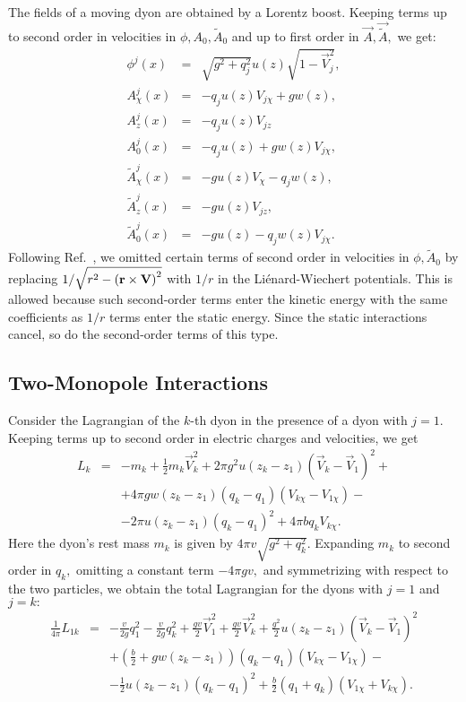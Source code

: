 \documentclass[a4paper,12pt, amsfonts, amssymb]{article}
\newcommand{\tA}{{\tilde{A}}}
\newcommand{\V}{{\vec{V}}}
\newcommand{\vA}{{\vec{A}}}
\newcommand{\vtA}{{\vec{\tilde{A}}}}
\newcommand{\nn}{\nonumber}
\begin{document}
The fields of a moving dyon are obtained by a Lorentz boost. Keeping terms
up to second order in velocities in $\phi,A_0,\tA_0$ and up to first
order in $\vA,\vtA,$ we get:
\begin{eqnarray}
\phi^j(x)&=&\sqrt{g^2+q_j^2}u(z)\sqrt{1-\V_j^2},\nn\\
A^j_{\chi}(x)&=&-q_j u(z)V_{j\chi}+g w(z),\nn\\
A^j_z(x)&=&-q_ju(z) V_{jz}\nn\\
A^j_0(x)&=&-q_j u(z)+g w(z) V_{j\chi},\\
\tA^j_{\chi}(x)&=&-g u(z)V_{\chi}-q_j w(z),\nn\\
\tA^j_z(x)&=&-g u(z)V_{jz},\nn\\
\tA^j_0(x)&=&-g u(z)-q_j w(z) V_{j\chi}. \nn
\end{eqnarray}
Following Ref.~\cite{GM}, we omitted certain terms of second order in
velocities in $\phi,\tA_0$
by replacing $1/\sqrt{r^2-\left({\bf r}\times {\bf V}\right)^2}$
with $1/r$ in the Li\'{e}nard-Wiechert potentials. This is allowed because
such second-order terms enter the kinetic energy with the same coefficients
as $1/r$ terms enter the static energy. Since the static interactions
cancel, so do the second-order terms of this type.

\subsection{Two-Monopole Interactions}\label{2mon}

Consider the Lagrangian of the $k$-th dyon in the presence of a dyon with
$j=1$.
Keeping terms up to second order in electric charges and velocities, we get
\begin{eqnarray}\label{one}
L_k&=&-m_k+\frac{1}{2}m_k \V_k^2+2\pi g^2 u(z_k-z_1) \left(\V_k-\V_1\right)^2+\nn\\
&&+4\pi g w(z_k-z_1)\left(q_k-q_1\right)\left(V_{k\chi}-V_{1\chi}\right)-\\
&&-2\pi u(z_k-z_1)\left(q_k-q_1\right)^2+4\pi b q_k V_{k\chi}.\nn
\end{eqnarray}
Here the dyon's rest mass $m_k$ is given by $4\pi v\sqrt{g^2+q_k^2}.$
Expanding $m_k$ to second order in $q_k,$ omitting a constant term
$-4\pi g v,$ and symmetrizing with respect to the two particles,
we obtain the total Lagrangian for the dyons with $j=1$ and $j=k:$
\begin{eqnarray}\label{two}
\frac{1}{4\pi}L_{1k}&=&-\frac{v}{2g}q_1^2-\frac{v}{2g}q_k^2+\frac{gv}{2} \V_1^2+\frac{gv}{2} \V_k^2+\frac{g^2}{2} u(z_k-z_1)(\V_k-\V_1)^2\nn\\
&&+\left(\frac{b}{2}+g w(z_k-z_1)\right)(q_k-q_1)(V_{k\chi}-V_{1\chi})-\\
&&-\frac{1}{2} u(z_k-z_1)(q_k-q_1)^2+
\frac{b}{2}(q_1+q_k)(V_{1\chi}+V_{k\chi}).\nn
\end{eqnarray}
\end{document}
